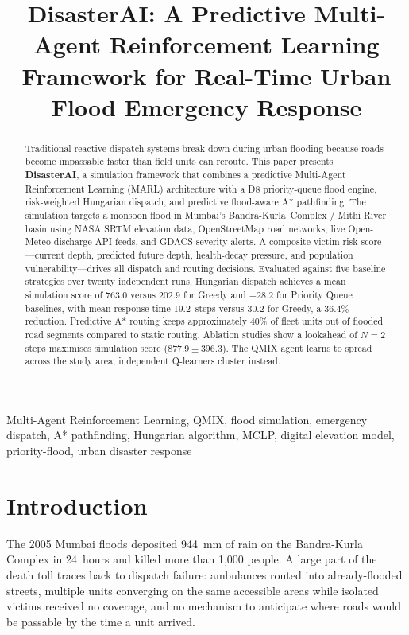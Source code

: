 \documentclass[conference]{IEEEtran}
\title{DisasterAI: A Predictive Multi-Agent Reinforcement Learning\\
Framework for Real-Time Urban Flood Emergency Response}
\author{
  \IEEEauthorblockN{Viraj H.~C.\textsuperscript{1},\quad Abhinav Tripathi\textsuperscript{1}}
  \IEEEauthorblockA{
    \textit{Supervisor: Mohandas R.}\\
    \textit{Department of Computer Science \& Engineering (AIML)}\\
    SRMIST, Kattankulathur, Chennai, India\\
    April 2026
  }
}
\begin{document}
\maketitle

\begin{abstract}
Traditional reactive dispatch systems break down during urban flooding because
roads become impassable faster than field units can reroute.
This paper presents \textbf{DisasterAI}, a simulation framework that combines a
predictive Multi-Agent Reinforcement Learning (MARL) architecture with a D8
priority-queue flood engine, risk-weighted Hungarian dispatch, and
predictive flood-aware A* pathfinding.
The simulation targets a monsoon flood in Mumbai's Bandra-Kurla~Complex /
Mithi River basin using NASA SRTM elevation data, OpenStreetMap road networks,
live Open-Meteo discharge API feeds, and GDACS severity alerts.
A composite victim risk score---current depth, predicted future depth,
health-decay pressure, and population vulnerability---drives all dispatch
and routing decisions.
Evaluated against five baseline strategies over twenty independent runs,
Hungarian dispatch achieves a mean simulation score of $763.0$ versus $202.9$
for Greedy and $-28.2$ for Priority Queue baselines, with mean response time
19.2~steps versus 30.2 for Greedy, a 36.4\% reduction.
Predictive A* routing keeps approximately 40\% of fleet units out of flooded
road segments compared to static routing.
Ablation studies show a lookahead of $N=2$ steps maximises simulation score
($877.9 \pm 396.3$).
The QMIX agent learns to spread across the study area; independent
Q-learners cluster instead.
\end{abstract}

\begin{IEEEkeywords}
Multi-Agent Reinforcement Learning, QMIX, flood simulation, emergency dispatch,
A* pathfinding, Hungarian algorithm, MCLP, digital elevation model,
priority-flood, urban disaster response
\end{IEEEkeywords}

\section{Introduction}
\label{sec:intro}

The 2005 Mumbai floods deposited 944~mm of rain on the Bandra-Kurla Complex
in 24~hours and killed more than 1,000 people.
A large part of the death toll traces back to dispatch failure: ambulances
routed into already-flooded streets, multiple units converging on the same
accessible areas while isolated victims received no coverage, and no mechanism
to anticipate where roads would be passable by the time a unit arrived.
\end{document}
